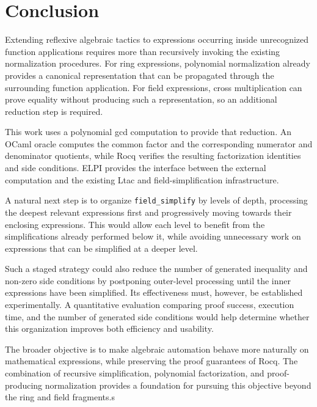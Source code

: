 \documentclass[11pt]{article}
\begin{document}
\section{Conclusion}

Extending reflexive algebraic tactics to expressions occurring inside
unrecognized function applications requires more than recursively invoking
the existing normalization procedures. For ring expressions, polynomial
normalization already provides a canonical representation that can be
propagated through the surrounding function application. For field
expressions, cross multiplication can prove equality without producing such a
representation, so an additional reduction step is required.

This work uses a polynomial gcd computation to provide that reduction. An
OCaml oracle computes the common factor and the corresponding numerator and
denominator quotients, while Rocq verifies the resulting factorization
identities and side conditions. ELPI provides the interface between the
external computation and the existing Ltac and field-simplification
infrastructure.

A natural next step is to organize
\texttt{field\_simplify} by levels of depth, processing the deepest
relevant expressions first and progressively moving towards their
enclosing expressions. This would allow each level to benefit from
the simplifications already performed below it, while avoiding
unnecessary work on expressions that can be simplified at a deeper
level.

Such a staged strategy could also reduce the number of generated
inequality and non-zero side conditions by postponing outer-level
processing until the inner expressions have been simplified. Its
effectiveness must, however, be established experimentally. A
quantitative evaluation comparing proof success, execution time,
and the number of generated side conditions would help determine
whether this organization improves both efficiency and usability.

The broader objective is to make algebraic automation behave more
naturally on mathematical expressions, while preserving the
proof guarantees of Rocq. The combination of recursive
simplification, polynomial factorization, and proof-producing
normalization provides a foundation for pursuing this objective
beyond the ring and field fragments.s
\end{document}
